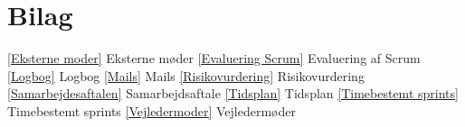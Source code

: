 \chapter{Bilag}\label{kapBilag}

\ref{Eksterne moder} Eksterne møder
\ref{Evaluering Scrum} Evaluering af Scrum
\ref{Logbog} Logbog
\ref{Mails} Mails
\ref{Risikovurdering} Risikovurdering
\ref{Samarbejdesaftalen} Samarbejdsaftale
\ref{Tidsplan} Tidsplan
\ref{Timebestemt sprints} Timebestemt sprints
\ref{Vejledermoder} Vejledermøder

